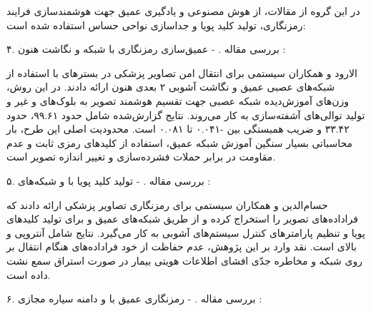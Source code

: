 در این گروه از مقالات، از هوش مصنوعی و یادگیری عمیق جهت هوشمندسازی فرایند رمزنگاری، تولید کلید پویا و جداسازی نواحی حساس استفاده شده است:\par



۴. بررسی مقاله .  {-} عمیق‌سازی رمزنگاری  با شبکه  و نگاشت هنون :\par

الارود و همکاران سیستمی برای انتقال امن تصاویر پزشکی در بسترهای  با استفاده از شبکه‌های عصبی عمیق  و نگاشت آشوبی ۲ بعدی هنون ارائه دادند. در این روش، وزن‌های آموزش‌دیده شبکه عصبی جهت تقسیم هوشمند تصویر به بلوک‌های  و غیر  و تولید توالی‌های آشفته‌سازی به کار می‌روند. نتایج گزارش‌شده شامل  حدود ۹۹.۶۱،  حدود ۳۳.۴۲ و ضریب همبستگی بین {-}۰.۰۴۱ تا ۰.۰۸۱ است. محدودیت اصلی این طرح، بار محاسباتی بسیار سنگین آموزش شبکه عمیق، استفاده از کلیدهای رمزی ثابت و عدم مقاومت در برابر حملات فشرده‌سازی و تغییر اندازه تصویر است.\par



۵. بررسی مقاله .  {-} تولید کلید پویا با  و شبکه‌های  :\par

حسام‌الدین و همکاران سیستمی برای رمزنگاری تصاویر پزشکی ارائه دادند که فراداده‌های  تصویر را استخراج کرده و از طریق شبکه‌های عمیق  و  برای تولید کلیدهای پویا و تنظیم پارامترهای کنترل سیستم‌های آشوبی به کار می‌گیرد. نتایج شامل آنتروپی  و  بالای  است. نقد وارد بر این پژوهش، عدم حفاظت از خود فراداده‌های  هنگام انتقال بر روی شبکه و مخاطره جدّی افشای اطلاعات هویتی بیمار در صورت استراق سمع نشت داده است.\par



۶. بررسی مقاله .  {-} رمزنگاری عمیق با  و دامنه سیاره مجازی  :\par

